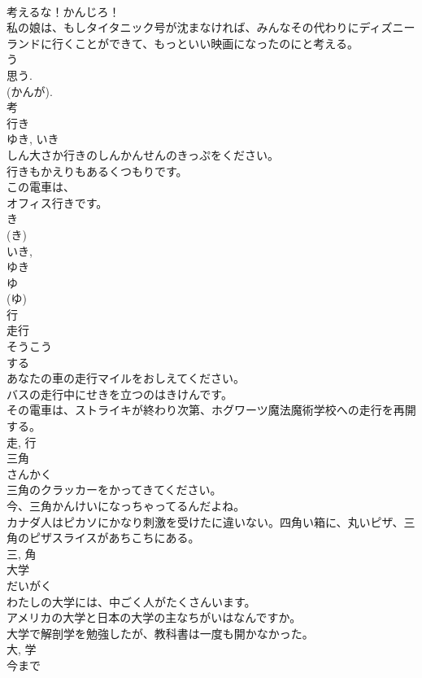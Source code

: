 \documentclass[8pt]{extreport}
\begin{document}
\begin{CJK}{UTF8}{min}
\\	考えるな！かんじろ！	
\\	私の娘は、もしタイタニック号が沈まなければ、みんなその代わりにディズニーランドに行くことができて、もっといい映画になったのにと考える。	
\\	う 
\\	思う.
\\	(かんが). 
\\	考	
\\	行き	
\\	ゆき, いき	
\\	しん大さか行きのしんかんせんのきっぷをください。	
\\	行きもかえりもあるくつもりです。	
\\	この電車は、
\\	オフィス行きです。	
\\	き 
\\	(き) 
\\	いき, 
\\	ゆき 
\\	ゆ 
\\	(ゆ) 
\\	行	
\\	走行	
\\	そうこう	
\\	する 
\\	あなたの車の走行マイルをおしえてください。	
\\	バスの走行中にせきを立つのはきけんです。	
\\	その電車は、ストライキが終わり次第、ホグワーツ魔法魔術学校への走行を再開する。	
\\	走, 行	
\\	三角	
\\	さんかく	
\\	三角のクラッカーをかってきてください。	
\\	今、三角かんけいになっちゃってるんだよね。	
\\	カナダ人はピカソにかなり刺激を受けたに違いない。四角い箱に、丸いピザ、三角のピザスライスがあちこちにある。	
\\	三, 角	
\\	大学	
\\	だいがく	
\\	わたしの大学には、中ごく人がたくさんいます。	
\\	アメリカの大学と日本の大学の主なちがいはなんですか。	
\\	大学で解剖学を勉強したが、教科書は一度も開かなかった。	
\\	大, 学	
\\	今まで	

\end{CJK}
\end{document}
